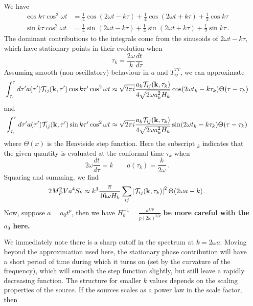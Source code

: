 \documentclass{revtex4}
\begin{document}
We have
\begin{subequations}
\begin{align}
  \cos k\tau\cos^2\omega t &= \frac{1}{4}\cos(2\omega t-k\tau) + \frac{1}{4}\cos(2\omega t+k\tau) + \frac{1}{2}\cos k\tau \\
  \sin k\tau\cos^2\omega t &= \frac{1}{4}\sin(2\omega t-k\tau) + \frac{1}{4}\sin(2\omega t+k\tau) + \frac{1}{2}\sin k\tau \, .
\end{align}
\end{subequations}
The dominant contributions to the integrals come from the sinusoids of $2\omega t - k\tau$, which have stationary points in their evolution when
\begin{equation}
  \tau_k = \frac{2\omega}{k}\frac{dt}{d\tau}
\end{equation}
Assuming smooth (non-oscillatory) behaviour in $a$ and $T_{ij}^{TT}$, we can approximate
\begin{equation}
  \int_{\tau_i}^\tau d\tau' a(\tau')\mathcal{T}_{ij}({\bf k},\tau')\cos k\tau'\cos^2\omega t \approx \sqrt{2\pi i}\frac{a_k\mathcal{T}_{ij}({\bf k},\tau_k)}{4\sqrt{2\omega a^2_kH_k}}\cos(2\omega t_k -k\tau_k)\Theta(\tau - \tau_k)
\end{equation}
and
\begin{equation}
  \int_{\tau_i}^\tau d\tau' a(\tau')\mathcal{T}_{ij}({\bf k},\tau')\sin k\tau'\cos^2\omega t \approx \sqrt{2\pi i}\frac{a_k\mathcal{T}_{ij}({\bf k},\tau_k)}{4\sqrt{2\omega a^2_kH_k}}\sin(2\omega t_k -k\tau_k)\Theta(\tau - \tau_k)
\end{equation}
where $\Theta(x)$ is the Heaviside step function.
Here the subscript ${}_k$ indicates that the given quantity is evaluated at the conformal time $\tau_k$ when
\begin{equation}
  2\omega\frac{dt}{d\tau} = k \qquad a(\tau_k) = \frac{k}{2\omega} \, .
\end{equation}
Squaring and summing, we find
\begin{equation}
  2M_P^2Va^4S_k \approx k^3\frac{\pi}{16 \omega H_k}\sum_{ij}\left|\mathcal{T}_{ij}({\bf k},\tau_k)\right|^2\Theta(2\omega a - k) \, .
\end{equation}
Now, suppose $a = a_0 t^p$, then we have $H_k^{-1} = \frac{k^{1/p}}{p(2\omega)^{1/p}}$
{\bf be more careful with the $a_0$ here.}

We immediately note there is a sharp cutoff in the spectrum at $k = 2\omega a$.
Moving beyond the approximation used here, the stationary phase contribution will have a short period of time during which it turns on (set by the curvature of the frequency), which will smooth the step function slightly, but still leave a rapidly decreasing function.
The structure for smaller $k$ values depends on the scaling properties of the source.
If the sources scales as a power law in the scale factor, then 
\end{document}
